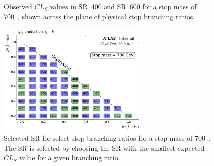 \begin{figure}[ht]
  \centering
  \caption{
    Observed $CL_S$ values in SR~400 and SR~600 for a stop mass of 700~\GeV,
    shown across the plane of physical stop branching ratios.
  }
\end{figure}

\begin{figure}[ht]
  \centering
  \includegraphics[width=0.65\textwidth]
    {figs/blstop/region_selection/region_choice_vs_br_m_700.pdf}
  \caption{
    Selected SR for select stop branching ratios for a stop mass of 700~\GeV.
    The SR is selected by choosing the SR with the smallest expected $CL_S$
    value for a given branching ratio.
  }
\end{figure}

